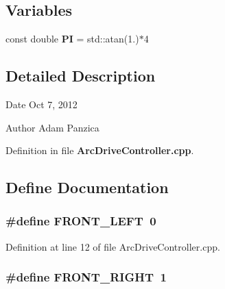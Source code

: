 \subsection*{\-Variables}
\begin{DoxyCompactItemize}
\item 
const double {\bf \-P\-I} = std\-::atan(1.)$\ast$4
\end{DoxyCompactItemize}


\subsection{\-Detailed \-Description}
\begin{DoxyDate}{\-Date}
\-Oct 7, 2012 
\end{DoxyDate}
\begin{DoxyAuthor}{\-Author}
\-Adam \-Panzica 
\end{DoxyAuthor}


\-Definition in file {\bf \-Arc\-Drive\-Controller.\-cpp}.



\subsection{\-Define \-Documentation}
\subsubsection[{\-F\-R\-O\-N\-T\-\_\-\-L\-E\-F\-T}]{\setlength{\rightskip}{0pt plus 5cm}\#define {\bf \-F\-R\-O\-N\-T\-\_\-\-L\-E\-F\-T}~0}\label{ArcDriveController_8cpp_a9d354e0b06ec23c0722f8a8538cad2a0}


\-Definition at line 12 of file \-Arc\-Drive\-Controller.\-cpp.

\subsubsection[{\-F\-R\-O\-N\-T\-\_\-\-R\-I\-G\-H\-T}]{\setlength{\rightskip}{0pt plus 5cm}\#define {\bf \-F\-R\-O\-N\-T\-\_\-\-R\-I\-G\-H\-T}~1}\label{ArcDriveController_8cpp_ab93bd6395d36692d43a18c9f1d70bd39}



